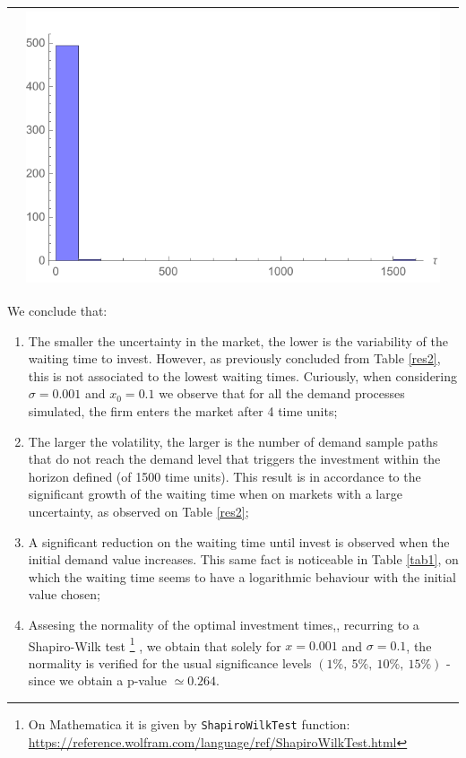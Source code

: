 \begin{table}[!htb]
\begin{tabular}{c|c|c}
\begin{minipage}{.45\textwidth}
		\end{minipage}
		& \begin{minipage}{.45\textwidth}
			\includegraphics[width=\linewidth]{StopTime/x01o5.pdf}
		\end{minipage} \\ \hline
	\end{tabular}
	\label{hist}
\end{table}


We conclude that:
\begin{enumerate}
	\item The smaller the uncertainty in the market, the lower is the variability of the waiting time to invest.
	However, as previously concluded from Table \ref{res2}, this is not associated to the lowest waiting times.
	Curiously, when considering $\sigma=0.001$ and $x_0=0.1$ we observe that for all the demand processes simulated, the firm enters the market after 4 time units;
	
	\item The larger the volatility, the larger is the number of demand sample paths that do not reach the demand level that triggers the investment within the horizon defined (of 1500 time units). This result is in accordance to the significant growth of the waiting time when on markets with a large uncertainty, as observed on Table \ref{res2};
	
	\item A significant reduction on the waiting time until invest is observed when the initial demand value increases. This same fact is noticeable in Table \ref{tab1}, on which the waiting time seems to have a logarithmic behaviour with the initial value chosen;
	
	\item Assesing the normality of the optimal investment times,, recurring to a Shapiro-Wilk test \cite{sw}\footnote{On Mathematica it is given by \texttt{ShapiroWilkTest} function: \url{https://reference.wolfram.com/language/ref/ShapiroWilkTest.html}}
		, we obtain that solely for $x=0.001$ and $\sigma=0.1$, the normality is verified for the usual significance levels $(1\%, \ 5\%, \ 10\%, \ 15\%)$ - since we obtain a p-value $\simeq 0.264$.
\end{enumerate}



